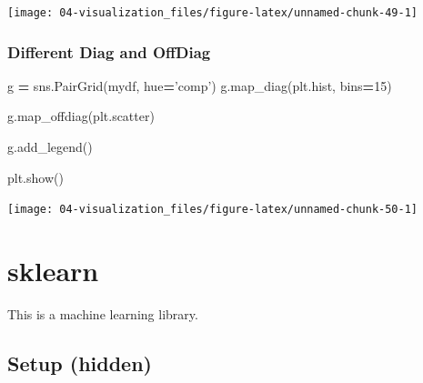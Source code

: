 \documentclass[
]{book}
\newenvironment{Shaded}{\begin{snugshade}}{\end{snugshade}}
\newcommand{\DecValTok}[1]{\textcolor[rgb]{0.06,0.06,0.06}{#1}}
\newcommand{\NormalTok}[1]{#1}
\newcommand{\OperatorTok}[1]{\textcolor[rgb]{0.43,0.43,0.43}{\textbf{#1}}}
\newcommand{\StringTok}[1]{\textcolor[rgb]{0.5,0.5,0.5}{#1}}
\begin{document}
\texttt{[image: 04-visualization\_files/figure-latex/unnamed-chunk-49-1]}

\hypertarget{different-diag-and-offdiag}{%
\subsection{Different Diag and OffDiag}\label{different-diag-and-offdiag}}

\begin{Shaded}
\begin{Highlighting}[]
\NormalTok{g }\OperatorTok{=}\NormalTok{ sns.PairGrid(mydf, hue}\OperatorTok{=}\StringTok{'comp'}\NormalTok{)}
\NormalTok{g.map_diag(plt.hist, bins}\OperatorTok{=}\DecValTok{15}\NormalTok{)}
\end{Highlighting}
\end{Shaded}

\begin{Shaded}
\begin{Highlighting}[]
\NormalTok{g.map_offdiag(plt.scatter)}
\end{Highlighting}
\end{Shaded}

\begin{Shaded}
\begin{Highlighting}[]
\NormalTok{g.add_legend()}
\end{Highlighting}
\end{Shaded}

\begin{Shaded}
\begin{Highlighting}[]
\NormalTok{plt.show()}
\end{Highlighting}
\end{Shaded}

\texttt{[image: 04-visualization\_files/figure-latex/unnamed-chunk-50-1]}

\hypertarget{sklearn}{%
\chapter{sklearn}\label{sklearn}}

This is a machine learning library.

\hypertarget{setup-hidden}{%
\section{Setup (hidden)}\label{setup-hidden}}
\end{document}
